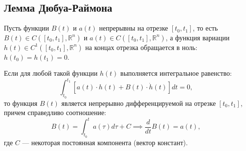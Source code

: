 \subsection{Лемма Дюбуа-Раймона}
\begin{lemma}
Пусть функции $B(t)$ и $a(t)$ непрерывны на отрезке $[t_0, t_1]$, то есть 
$B(t) \in C([t_0, t_1], \mathbb{R}^n)$ и $a(t) \in C([t_0, t_1], \mathbb{R}^n)$, а функция вариации 
$h(t) \in C^1([t_0, t_1], \mathbb{R}^n)$ на концах отрезка обращается в ноль: $h(t_0) = h(t_1) = 0$. 

Если для любой такой функции $h(t)$ выполняется интегральное равенство:
\begin{equation}
    \int_{t_0}^{t_1} \left[ a(t) \cdot h(t) + B(t) \cdot \dot{h}(t) \right] dt = 0,
\end{equation}
то функция $B(t)$ является непрерывно дифференцируемой на отрезке $[t_0, t_1]$, причем справедливо соотношение:
\begin{equation}
    B(t) = \int_{t_0}^t a(\tau) d\tau + C \implies \frac{d}{dt} B(t) = a(t),
\end{equation}
где $C$ --- некоторая постоянная компонента (вектор констант).
\end{lemma}

